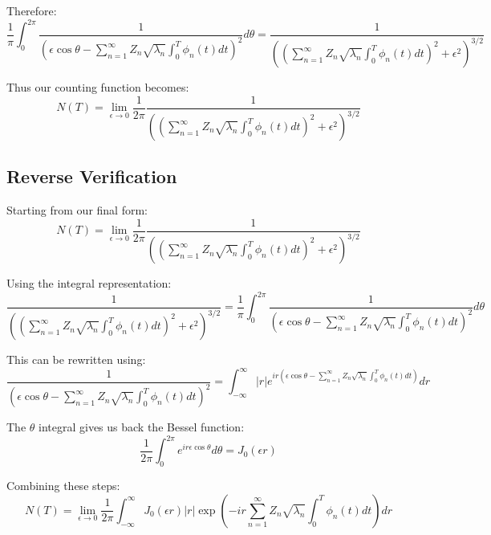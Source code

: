 \documentclass{article}
\begin{document}
Therefore:
\begin{equation}
    \frac{1}{\pi} \int_0^{2\pi} \frac{1}{(\epsilon\cos\theta - \sum_{n=1}^{\infty} Z_n \sqrt{\lambda_n} \int_0^T \phi_n(t) dt)^2} d\theta = \frac{1}{((\sum_{n=1}^{\infty} Z_n \sqrt{\lambda_n} \int_0^T \phi_n(t) dt)^2 + \epsilon^2)^{3/2}}
\end{equation}

Thus our counting function becomes:
\begin{equation}
    N(T) = \lim_{\epsilon \to 0} \frac{1}{2\pi} \frac{1}{((\sum_{n=1}^{\infty} Z_n \sqrt{\lambda_n} \int_0^T \phi_n(t) dt)^2 + \epsilon^2)^{3/2}}
\end{equation}

\subsection{Reverse Verification}
Starting from our final form:
\begin{equation}
    N(T) = \lim_{\epsilon \to 0} \frac{1}{2\pi} \frac{1}{((\sum_{n=1}^{\infty} Z_n \sqrt{\lambda_n} \int_0^T \phi_n(t) dt)^2 + \epsilon^2)^{3/2}}
\end{equation}

Using the integral representation:
\begin{equation}
    \frac{1}{((\sum_{n=1}^{\infty} Z_n \sqrt{\lambda_n} \int_0^T \phi_n(t) dt)^2 + \epsilon^2)^{3/2}} = \frac{1}{\pi} \int_0^{2\pi} \frac{1}{(\epsilon\cos\theta - \sum_{n=1}^{\infty} Z_n \sqrt{\lambda_n} \int_0^T \phi_n(t) dt)^2} d\theta
\end{equation}

This can be rewritten using:
\begin{equation}
    \frac{1}{(\epsilon\cos\theta - \sum_{n=1}^{\infty} Z_n \sqrt{\lambda_n} \int_0^T \phi_n(t) dt)^2} = \int_{-\infty}^{\infty} |r| e^{ir(\epsilon\cos\theta - \sum_{n=1}^{\infty} Z_n \sqrt{\lambda_n} \int_0^T \phi_n(t) dt)} dr
\end{equation}

The $\theta$ integral gives us back the Bessel function:
\begin{equation}
    \frac{1}{2\pi} \int_0^{2\pi} e^{ir\epsilon\cos\theta} d\theta = J_0(\epsilon r)
\end{equation}

Combining these steps:
\begin{equation}
    N(T) = \lim_{\epsilon \to 0} \frac{1}{2\pi} \int_{-\infty}^{\infty} J_0(\epsilon r)|r| \exp\left(-ir\sum_{n=1}^{\infty} Z_n \sqrt{\lambda_n} \int_0^T \phi_n(t) dt\right) dr
\end{equation}
\end{document}
